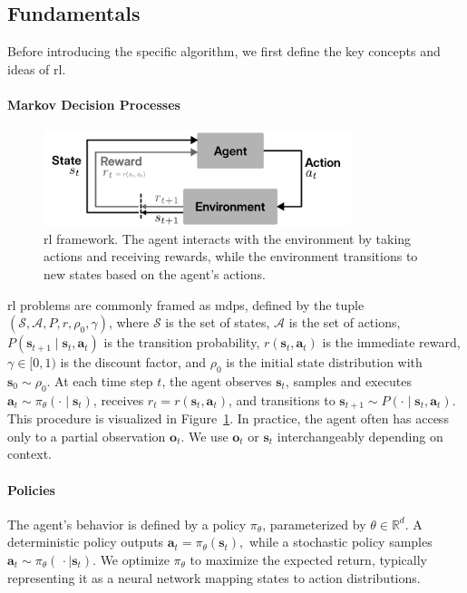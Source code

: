 \subsection{Fundamentals}
Before introducing the specific algorithm, we first define the key concepts and ideas of \gls{rl}.
\paragraph{Markov Decision Processes}

\begin{figure}
\centering
\includegraphics[width=0.8\textwidth]{images/figs/rl.pdf}
\caption[ Framework]{\gls{rl} framework. The agent interacts with the environment by taking actions and receiving rewards, while the environment transitions to new states based on the agent's actions.}
\label{fig:rl_diagram}
\end{figure}

\gls{rl} problems are commonly framed as \gls{mdp}s, defined by the tuple \((\mathcal{S}, \mathcal{A}, P, r, \rho_0, \gamma)\), where \(\mathcal{S}\) is the set of states, \(\mathcal{A}\) is the set of actions, \(P(\mathbf{s}_{t+1}\!\mid\!\mathbf{s}_t,\mathbf{a}_t)\) is the transition probability, \(r(\mathbf{s}_t,\mathbf{a}_t)\) is the immediate reward, \(\gamma \in [0,1)\) is the discount factor, and \(\rho_0\) is the initial state distribution with \(\mathbf{s}_0 \sim \rho_0\). At each time step \(t\), the agent observes \(\mathbf{s}_t\), samples and executes \(\mathbf{a}_t \sim \pi_\theta(\cdot\mid \mathbf{s}_t)\), receives \(r_t = r(\mathbf{s}_t,\mathbf{a}_t)\), and transitions to \(\mathbf{s}_{t+1} \sim P(\cdot\mid \mathbf{s}_t,\mathbf{a}_t)\). This procedure is visualized in Figure~\ref{fig:rl_diagram}. In practice, the agent often has access only to a partial observation \(\mathbf{o}_t\). We use \(\mathbf{o}_t\) or \(\mathbf{s}_t\) interchangeably depending on context.

\paragraph{Policies}
The agent's behavior is defined by a policy \(\pi_{\theta}\), parameterized by \(\theta \in \mathbb{R}^{d}\). A deterministic policy outputs
$ 
\mathbf{a}_t = \pi_{\theta}(\mathbf{s}_t),
$
while a stochastic policy samples
$
\mathbf{a}_t \sim \pi_{\theta}(\,\cdot\mid \mathbf{s}_t).
$
We optimize \(\pi_\theta\) to maximize the expected return, typically representing it as a neural network mapping states to action distributions.


